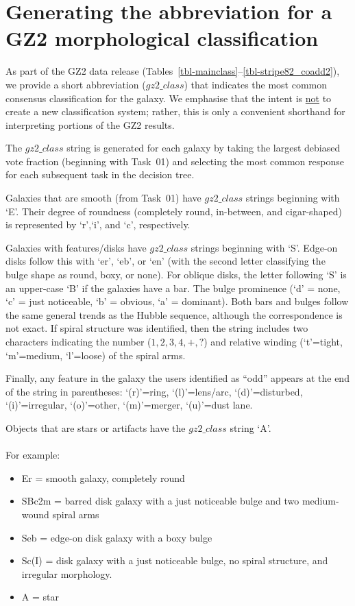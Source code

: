 \documentclass[useAMS,usenatbib]{mn2e}
\begin{document}
\appendix
\section{Generating the abbreviation for a GZ2 morphological classification}\label{app-gzstring}
As part of the GZ2 data release (Tables~\ref{tbl-mainclass}--\ref{tbl-stripe82_coadd2}), we provide a short abbreviation ($gz2\_class$) that indicates the most common consensus classification for the galaxy. We emphasise that the intent is \underline{not} to create a new classification system; rather, this is only a convenient shorthand for interpreting portions of the GZ2 results.

The $gz2\_class$ string is generated for each galaxy by taking the largest debiased vote fraction (beginning with Task~01) and selecting the most common response for each subsequent task in the decision tree. 

Galaxies that are smooth (from Task~01) have $gz2\_class$ strings beginning with `E'. Their degree of roundness (completely round, in-between, and cigar-shaped) is represented by `r',`i', and `c', respectively. 

Galaxies with features/disks have $gz2\_class$ strings beginning with `S'. Edge-on disks follow this with `er', `eb', or `en' (with the second letter classifying the bulge shape as round, boxy, or none). For oblique disks, the letter following `S' is an upper-case `B' if the galaxies have a bar. The bulge prominence (`d' = none, `c' = just noticeable, `b' = obvious, `a' = dominant). Both bars and bulges follow the same general trends as the Hubble sequence, although the correspondence is not exact. If spiral structure was identified, then the string includes two characters indicating the number ($1,2,3,4,+,?$) and relative winding (`t'=tight, `m'=medium, `l'=loose) of the spiral arms. 

Finally, any feature in the galaxy the users identified as ``odd'' appears at the end of the string in parentheses: `(r)'=ring, `(l)'=lens/arc, `(d)'=disturbed, `(i)'=irregular, `(o)'=other, `(m)'=merger, `(u)'=dust lane. 

Objects that are stars or artifacts have the $gz2\_class$ string `A'.
\\
\\
For example: 
\begin{itemize}
\item Er = smooth galaxy, completely round
\item SBc2m = barred disk galaxy with a just noticeable bulge and two medium-wound spiral arms
\item Seb = edge-on disk galaxy with a boxy bulge
\item Sc(I) = disk galaxy with a just noticeable bulge, no spiral structure, and irregular morphology.
\item A = star
\end{itemize}
\end{document}
